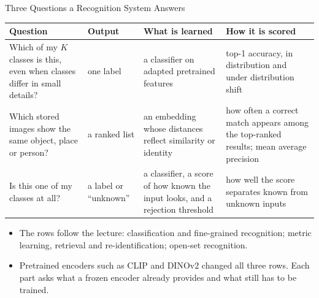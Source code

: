 \begin{frame}{Three Questions a Recognition System Answers}
  \centering
  \vspace{0.3em}
  {\scriptsize
  \begin{tabular}{>{\raggedright\arraybackslash}p{3.3cm} >{\raggedright\arraybackslash}p{1.9cm} >{\raggedright\arraybackslash}p{3.3cm} >{\raggedright\arraybackslash}p{3.6cm}}
    \toprule
    \textbf{Question} & \textbf{Output} & \textbf{What is learned} & \textbf{How it is scored} \\
    \midrule
    Which of my $K$ classes is this, even when classes differ in small details? & one label & a classifier on adapted pretrained features & top-1 accuracy, in distribution and under distribution shift \\
    \addlinespace[0.35em]
    Which stored images show the same object, place or person? & a ranked list & an embedding whose distances reflect similarity or identity & how often a correct match appears among the top-ranked results; mean average precision \\
    \addlinespace[0.35em]
    Is this one of my classes at all? & a label or ``unknown'' & a classifier, a score of how known the input looks, and a rejection threshold & how well the score separates known from unknown inputs \\
    \bottomrule
  \end{tabular}\par}
  \vspace{0.8em}
  \begin{itemize}\footnotesize\itemsep0.35em
    \item The rows follow the lecture: classification and fine-grained recognition; metric learning, retrieval and re-identification; open-set recognition.
    \item Pretrained encoders such as CLIP and DINOv2 changed all three rows. Each part asks what a frozen encoder already provides and what still has to be trained.
  \end{itemize}
\end{frame}
